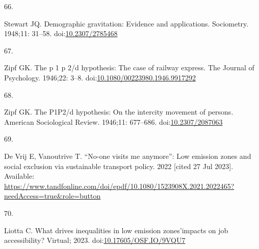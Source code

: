 \documentclass[10pt,letterpaper]{article}
\newlength{\cslhangindent}
\newlength{\csllabelwidth}
\newlength{\cslentryspacingunit} %
\newenvironment{CSLReferences}[2] %
 {%
  \setlength{\parindent}{0pt}
  \ifodd #1
  \let\oldpar\par
  \def\par{\hangindent=\cslhangindent\oldpar}
  \fi
  \setlength{\parskip}{#2\cslentryspacingunit}
 }%
 {}
\newcommand{\CSLLeftMargin}[1]{\parbox[t]{\csllabelwidth}{#1}}
\newcommand{\CSLRightInline}[1]{\parbox[t]{\linewidth - \csllabelwidth}{#1}\break}
\providecommand{\DIFaddbegin}{} %
\providecommand{\DIFaddend}{} %
\providecommand{\DIFdelbegin}{} %
\providecommand{\DIFdelend}{} %
\newcommand{\DIFscaledelfig}{0.5}
\newlength{\DIFdelgraphicswidth} %
\newlength{\DIFdelgraphicsheight} %
\newcommand{\DIFaddincludegraphics}[2][]{{\color{blue}\fbox{\DIFOincludegraphics[#1]{#2}}}} %
\newcommand{\DIFdelincludegraphics}[2][]{%
\sbox{\DIFdelgraphicsbox}{\DIFOincludegraphics[#1]{#2}}%
\settoboxwidth{\DIFdelgraphicswidth}{\DIFdelgraphicsbox} %
\settoboxtotalheight{\DIFdelgraphicsheight}{\DIFdelgraphicsbox} %
\scalebox{\DIFscaledelfig}{%
\parbox[b]{\DIFdelgraphicswidth}{\usebox{\DIFdelgraphicsbox}\\[-\baselineskip] \rule{\DIFdelgraphicswidth}{0em}}\llap{\resizebox{\DIFdelgraphicswidth}{\DIFdelgraphicsheight}{%
\setlength{\unitlength}{\DIFdelgraphicswidth}%
\begin{picture}(1,1)%
\thicklines\linethickness{2pt} %
{\color[rgb]{1,0,0}\put(0,0){\framebox(1,1){}}}%
{\color[rgb]{1,0,0}\put(0,0){\line( 1,1){1}}}%
{\color[rgb]{1,0,0}\put(0,1){\line(1,-1){1}}}%
\end{picture}%
}\hspace*{3pt}}} %
} %
\DeclareRobustCommand{\DIFaddbegin}{\DIFOaddbegin \let\includegraphics\DIFaddincludegraphics} %
\DeclareRobustCommand{\DIFaddend}{\DIFOaddend \let\includegraphics\DIFOincludegraphics} %
\DeclareRobustCommand{\DIFdelbegin}{\DIFOdelbegin \let\includegraphics\DIFdelincludegraphics} %
\DeclareRobustCommand{\DIFdelend}{\DIFOaddend \let\includegraphics\DIFOincludegraphics} %
\begin{document}
\begin{CSLReferences}{0}{0}
\leavevmode{}%
\DIFdelbegin %
\DIFdelend \DIFaddbegin \CSLLeftMargin{66. }\DIFaddend %
\CSLRightInline{Stewart JQ. Demographic gravitation: Evidence and
applications. Sociometry. 1948;11: 31--58.
doi:\href{https://doi.org/10.2307/2785468}{10.2307/2785468}}

\leavevmode{}%
\DIFdelbegin %
\DIFdelend \DIFaddbegin \CSLLeftMargin{67. }\DIFaddend %
\CSLRightInline{Zipf GK. The p 1 p 2/d hypothesis: The case of railway
express. The Journal of Psychology. 1946;22: 3--8.
doi:\href{https://doi.org/10.1080/00223980.1946.9917292}{10.1080/00223980.1946.9917292}}

\leavevmode{}%
\DIFdelbegin %
\DIFdelend \DIFaddbegin \CSLLeftMargin{68. }\DIFaddend %
\CSLRightInline{Zipf GK. The P1P2/d hypothesis: On the intercity
movement of persons. American Sociological Review. 1946;11: 677--686.
doi:\href{https://doi.org/10.2307/2087063}{10.2307/2087063}}

\leavevmode{}%
\DIFdelbegin %
\DIFdelend \DIFaddbegin \CSLLeftMargin{69. }\DIFaddend %
\CSLRightInline{De Vrij E, Vanoutrive T. {``No-one visits me anymore''}:
Low emission zones and social exclusion via sustainable transport
policy. 2022 {[}cited 27 Jul 2023{]}. Available:
\url{https://www.tandfonline.com/doi/epdf/10.1080/1523908X.2021.2022465?needAccess=true\&role=button}}

\leavevmode{}%
\DIFdelbegin %
\DIFdelend \DIFaddbegin \CSLLeftMargin{70. }\DIFaddend %
\CSLRightInline{Liotta C. What drives inequalities in low emission
zones'impacts on job accessibility? Virtual; 2023.
doi:\href{https://doi.org/10.17605/OSF.IO/9VQU7}{10.17605/OSF.IO/9VQU7}}

\end{CSLReferences}

\nolinenumbers
\end{document}

